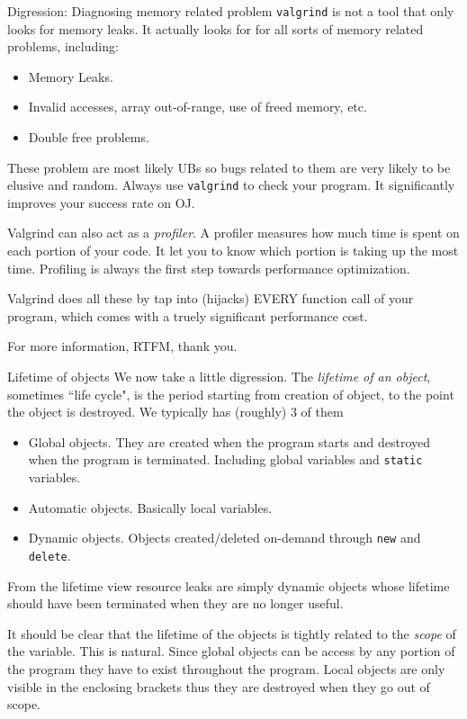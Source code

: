 \begin{frame}{Digression: Diagnosing memory related problem}
\small
\texttt{valgrind} is not a tool that only looks for memory leaks. It actually looks for for all sorts of memory related problems, including:
\begin{itemize}
	\item Memory Leaks. 
	\item Invalid accesses, array out-of-range, use of freed memory, etc.
	\item Double free problems.
\end{itemize}
These problem are most likely UBs so bugs related to them are very likely to be elusive and random. Always use \texttt{valgrind} to check your program. It significantly improves your success rate on OJ.

Valgrind can also act as a \textit{profiler}. A profiler measures how much time is spent on each portion of your code. It let you to know which portion is taking up the most time. Profiling is always the first step towards performance optimization.

Valgrind does all these by tap into (hijacks) EVERY function call of your program, which comes with a truely significant performance cost. 

For more information, RTFM, thank you. 
\end{frame}

\begin{frame}{Lifetime of objects}
\small
We now take a little digression. The \textit{lifetime of an object}, sometimes ``life cycle", is the period starting from creation of object, to the point the object is destroyed. We typically has (roughly) 3 of them
\begin{itemize}
\item Global objects. They are created when the program starts and destroyed when the program is terminated. Including global variables and \texttt{static} variables.
\item Automatic objects. Basically local variables.
\item Dynamic objects. Objects created/deleted on-demand through \texttt{new} and \texttt{delete}.
\end{itemize}
From the lifetime view resource leaks are simply dynamic objects whose lifetime should have been terminated when they are no longer useful.

It should be clear that the lifetime of the objects is tightly related to the \textit{scope} of the variable. This is natural. Since global objects can be access by any portion of the program they have to exist throughout the program. Local objects are only visible in the enclosing brackets thus they are destroyed when they go out of scope. 
\end{frame}



